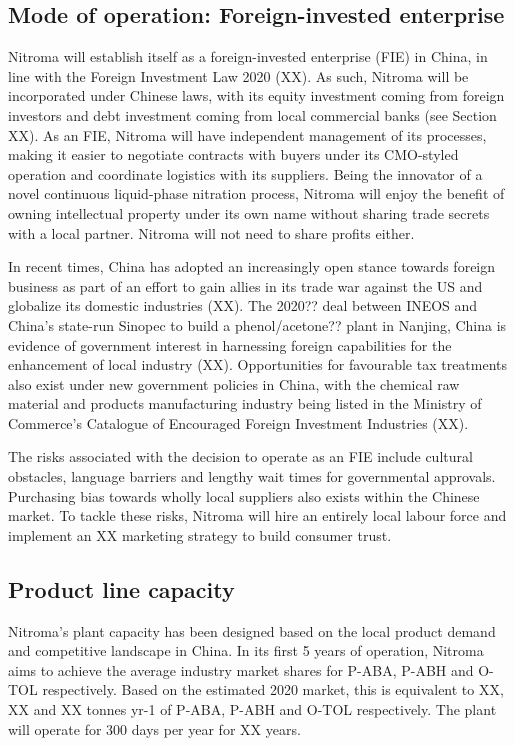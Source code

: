 \subsection{Mode of operation: Foreign-invested enterprise}
Nitroma will establish itself as a foreign-invested enterprise (FIE) in China, in line with the Foreign Investment Law 2020 (XX). As such, Nitroma will be incorporated under Chinese laws, with its equity investment coming from foreign investors and debt investment coming from local commercial banks (see Section XX). As an FIE, Nitroma will have independent management of its processes, making it easier to negotiate contracts with buyers under its CMO-styled operation and coordinate logistics with its suppliers. Being the innovator of a novel continuous liquid-phase nitration process, Nitroma will enjoy the benefit of owning intellectual property under its own name without sharing trade secrets with a local partner. Nitroma will not need to share profits either. 

In recent times, China has adopted an increasingly open stance towards foreign business as part of an effort to gain allies in its trade war against the US and globalize its domestic industries (XX). The 2020?? deal between INEOS and China’s state-run Sinopec to build a phenol/acetone?? plant in Nanjing, China is evidence of government interest in harnessing foreign capabilities for the enhancement of local industry (XX). Opportunities for favourable tax treatments also exist under new government policies in China, with the chemical raw material and products manufacturing industry being listed in the Ministry of Commerce’s Catalogue of Encouraged Foreign Investment Industries (XX). 

The risks associated with the decision to operate as an FIE include cultural obstacles, language barriers and lengthy wait times for governmental approvals. Purchasing bias towards wholly local suppliers also exists within the Chinese market. To tackle these risks, Nitroma will hire an entirely local labour force and implement an XX marketing strategy to build consumer trust.


\subsection{Product line capacity}
Nitroma’s plant capacity has been designed based on the local product demand and competitive landscape in China. In its first 5 years of operation, Nitroma aims to achieve the average industry market shares for P-ABA, P-ABH and O-TOL respectively. Based on the estimated 2020 market, this is equivalent to XX, XX and XX tonnes yr-1 of P-ABA, P-ABH and O-TOL respectively. The plant will operate for 300 days per year for XX years.

